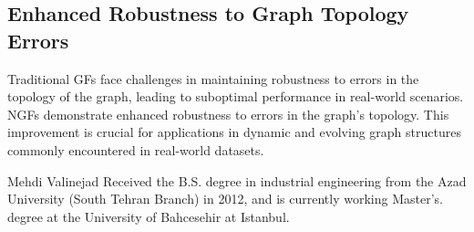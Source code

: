 \documentclass[journal]{IEEEtran}
\begin{document}
\subsection*{Enhanced Robustness to Graph Topology Errors}

Traditional GFs face challenges in maintaining robustness to errors in the topology of the graph, leading to suboptimal performance in real-world scenarios.
NGFs demonstrate enhanced robustness to errors in the graph's topology. This improvement is crucial for applications in dynamic and evolving graph structures commonly encountered in real-world datasets.

\ifCLASSOPTIONcaptionsoff
  \newpage
\fi






\begin{IEEEbiographynophoto}{Mehdi Valinejad}
Received the B.S. degree in industrial engineering from the Azad University (South Tehran Branch) in 2012, and is currently working Master's. degree at the University of Bahcesehir at Istanbul.
\end{IEEEbiographynophoto}
\end{document}
